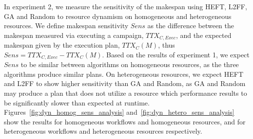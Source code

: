 In experiment 2, we measure the sensitivity of the makespan using HEFT, L2FF, GA
and Random to resource dynamism on homogeneous and heterogeneous resources. We
define makespan sensitivity $Sens$ as the difference between the makespan
measured via executing a campaign, $TTX_{C, Exec}$, and the expected makespan
given by the execution plan, $TTX_{C}(M)$, thus $Sens = TTX_{C, Exec} -
TTX_{C}(M)$. Based on the results of experiment 1, we expect $Sens$ to be
similar between algorithms on homogeneous resources, as the three algorithms
produce similar plans. On heterogeneous resources, we expect HEFT and L2FF to
show higher sensitivity than GA and Random, as GA and Random may produce a plan
that does not utilize a resource which performance results to be significantly
slower than expected at runtime. Figures~\ref{fig:dyn_homog_sens_analysis}
and~\ref{fig:dyn_hetero_sens_analysis} show the results for homogeneous
workflows and homogeneous resources, and for heterogeneous workflows and
heterogeneous resources respectively.

